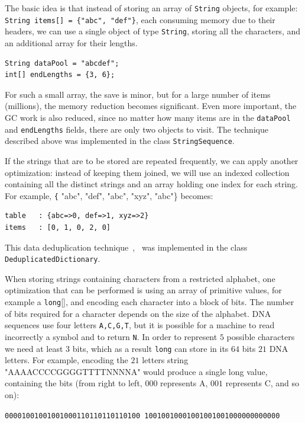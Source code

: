 \documentclass[a4paper,twoside]{article}
\begin{document}

The basic idea is that instead of storing an array of {\texttt{String}} objects, for example:
{\tt String items[] = \{"abc", "def"\}}, each consuming memory due to their headers, we can use 
a single object of type {\texttt{String}}, storing all the characters, and an additional array for their lengths.
\begin{verbatim}
String dataPool = "abcdef";
int[] endLengths = {3, 6};
\end{verbatim}

For such a small array, the save is minor, but for a large number of items (millions), the memory reduction becomes significant.
Even more important, the GC work is also reduced, since no matter how many items are in the {\texttt{dataPool}} and {\texttt{endLengths}} fields, there are only two objects to visit.
The technique described above was implemented in the class {\texttt{StringSequence}}.

If the strings that are to be stored are repeated frequently, we can apply another optimization:
instead of keeping them joined, we will use an indexed collection containing all the distinct strings and an array holding one index for each string.
For example, {\texttt{\{} "abc", "def", "abc", "xyz", "abc"\}} becomes:
\begin{verbatim}
table   : {abc=>0, def=>1, xyz=>2}
items   : [0, 1, 0, 2, 0]
\end{verbatim}
This data deduplication technique~\cite{he:2010},~\cite{manogar:2014} was implemented in the class {\texttt{DeduplicatedDictionary}}.

When storing strings containing characters from a restricted alphabet, one optimization that can be performed is using an array of primitive values, for example a {\texttt{long}[]}, and encoding each character into a block of bits.
The number of bits required for a character depends on the size of the alphabet.
DNA sequences use four letters {\texttt{A,C,G,T}}, but it is possible for a machine to read incorrectly a symbol and to return {\texttt{N}}.
In order to represent $5$ possible characters we need at least $3$ bits,
which as a result {\texttt{long}} can store in its $64$ bits $21$ DNA letters.
For example, encoding the $21$ letters string "AAAACCCCGGGGTTTTNNNNA" would produce a single long value, containing the bits (from right to left, $000$ represents A, $001$ represents C, and so on):\\
{\texttt{00001001001001000110110110110100
10010010001001001001000000000000}

}
\end{document}
